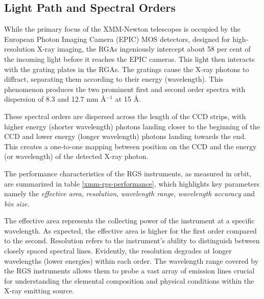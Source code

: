		\subsection{Light Path and Spectral Orders}
			While the primary focus of the XMM-Newton telescopes is occupied by the European Photon Imaging Camera (EPIC) MOS detectors, designed for high-resolution X-ray imaging, the RGAs ingeniously intercept about 58 per cent of the incoming light before it reaches the EPIC cameras. This light then interacts with the grating plates in the RGAs. The gratings cause the X-ray photons to diffract, separating them according to their energy (wavelength). This phenomenon produces the two prominent first and second order spectra with dispersion of 8.3 and 12.7 mm \AA$^{-1}$ at 15 \AA.
			
			These spectral orders are dispersed across the length of the CCD strips, with higher energy (shorter wavelength) photons landing closer to the beginning of the CCD and lower energy (longer wavelength) photons landing towards the end. This creates a one-to-one mapping between position on the CCD and the energy (or wavelength) of the detected X-ray photon.
			
			The performance characteristics of the RGS instruments, as measured in orbit, are summarized in table \ref{xmm-rgs-performance}, which highlights key parameters namely the \textit{effective area}, \textit{resolution}, \textit{wavelength range}, \textit{wavelength accuracy} and \textit{bin size}.
	
			The effective area represents the collecting power of the instrument at a specific wavelength. As expected, the effective area is higher for the first order compared to the second. Resolution refers to the instrument's ability to distinguish between closely spaced spectral lines. Evidently, the resolution degrades at longer wavelengths (lower energies) within each order. The wavelength range covered by the RGS instruments allows them to probe a vast array of emission lines crucial for understanding the elemental composition and physical conditions within the X-ray emitting source.
			
